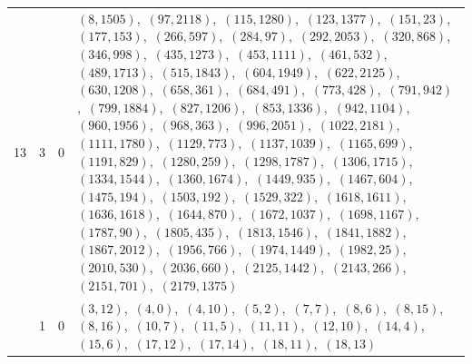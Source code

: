 \documentclass[11pt]{article}
\begin{document}
\begin{longtable}{@{}rrl>{\raggedright\arraybackslash}p{}@{}}
13 & 3 & $0$ & $(8,1505)$,\allowbreak\ $(97,2118)$,\allowbreak\ $(115,1280)$,\allowbreak\ $(123,1377)$,\allowbreak\ $(151,23)$,\allowbreak\ $(177,153)$,\allowbreak\ $(266,597)$,\allowbreak\ $(284,97)$,\allowbreak\ $(292,2053)$,\allowbreak\ $(320,868)$,\allowbreak\ $(346,998)$,\allowbreak\ $(435,1273)$,\allowbreak\ $(453,1111)$,\allowbreak\ $(461,532)$,\allowbreak\ $(489,1713)$,\allowbreak\ $(515,1843)$,\allowbreak\ $(604,1949)$,\allowbreak\ $(622,2125)$,\allowbreak\ $(630,1208)$,\allowbreak\ $(658,361)$,\allowbreak\ $(684,491)$,\allowbreak\ $(773,428)$,\allowbreak\ $(791,942)$,\allowbreak\ $(799,1884)$,\allowbreak\ $(827,1206)$,\allowbreak\ $(853,1336)$,\allowbreak\ $(942,1104)$,\allowbreak\ $(960,1956)$,\allowbreak\ $(968,363)$,\allowbreak\ $(996,2051)$,\allowbreak\ $(1022,2181)$,\allowbreak\ $(1111,1780)$,\allowbreak\ $(1129,773)$,\allowbreak\ $(1137,1039)$,\allowbreak\ $(1165,699)$,\allowbreak\ $(1191,829)$,\allowbreak\ $(1280,259)$,\allowbreak\ $(1298,1787)$,\allowbreak\ $(1306,1715)$,\allowbreak\ $(1334,1544)$,\allowbreak\ $(1360,1674)$,\allowbreak\ $(1449,935)$,\allowbreak\ $(1467,604)$,\allowbreak\ $(1475,194)$,\allowbreak\ $(1503,192)$,\allowbreak\ $(1529,322)$,\allowbreak\ $(1618,1611)$,\allowbreak\ $(1636,1618)$,\allowbreak\ $(1644,870)$,\allowbreak\ $(1672,1037)$,\allowbreak\ $(1698,1167)$,\allowbreak\ $(1787,90)$,\allowbreak\ $(1805,435)$,\allowbreak\ $(1813,1546)$,\allowbreak\ $(1841,1882)$,\allowbreak\ $(1867,2012)$,\allowbreak\ $(1956,766)$,\allowbreak\ $(1974,1449)$,\allowbreak\ $(1982,25)$,\allowbreak\ $(2010,530)$,\allowbreak\ $(2036,660)$,\allowbreak\ $(2125,1442)$,\allowbreak\ $(2143,266)$,\allowbreak\ $(2151,701)$,\allowbreak\ $(2179,1375)$\\
\addlinespace[3pt]
19 & 1 & $0$ & $(3,12)$,\allowbreak\ $(4,0)$,\allowbreak\ $(4,10)$,\allowbreak\ $(5,2)$,\allowbreak\ $(7,7)$,\allowbreak\ $(8,6)$,\allowbreak\ $(8,15)$,\allowbreak\ $(8,16)$,\allowbreak\ $(10,7)$,\allowbreak\ $(11,5)$,\allowbreak\ $(11,11)$,\allowbreak\ $(12,10)$,\allowbreak\ $(14,4)$,\allowbreak\ $(15,6)$,\allowbreak\ $(17,12)$,\allowbreak\ $(17,14)$,\allowbreak\ $(18,11)$,\allowbreak\ $(18,13)$\\

\end{longtable}
\end{document}
